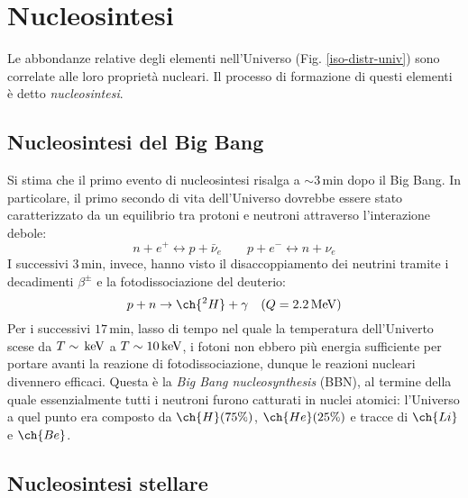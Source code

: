 
\section{Nucleosintesi}

Le abbondanze relative degli elementi nell'Universo (Fig. \ref{iso-distr-univ}) sono correlate alle loro proprietà nucleari. Il processo di formazione di questi elementi è detto \textit{nucleosintesi}.

\subsection{Nucleosintesi del Big Bang}

Si stima che il primo evento di nucleosintesi risalga a $ \sim 3\,\text{min} $ dopo il Big Bang. In particolare, il primo secondo di vita dell'Universo dovrebbe essere stato caratterizzato da un equilibrio tra protoni e neutroni attraverso l'interazione debole:
\begin{equation*}
	n + e^+ \leftrightarrow p + \bar{\nu}_e
	\qquad
	p + e^- \leftrightarrow n + \nu_e
\end{equation*}
I successivi $ 3\,\text{min} $, invece, hanno visto il disaccoppiamento dei neutrini tramite i decadimenti $ \beta^{\pm} $ e la fotodissociazione del deuterio:
\begin{equation*}
	p + n \rightarrow \ch{^2 H} + \gamma \quad (Q = 2.2 \mev)
\end{equation*}
Per i successivi $ 17\,\text{min} $, lasso di tempo nel quale la temperatura dell'Univerto scese da $ T \sim \,\mathrm{keV} $ a $ T \sim 10\,\mathrm{keV} $, i fotoni non ebbero più energia sufficiente per portare avanti la reazione di fotodissociazione, dunque le reazioni nucleari divennero efficaci. Questa è la \textit{Big Bang nucleosynthesis} (BBN), al termine della quale essenzialmente tutti i neutroni furono catturati in nuclei atomici: l'Universo a quel punto era composto da $ \ch{H} (75\%) $, $ \ch{He} (25\%) $ e tracce di $ \ch{Li} $ e $ \ch{Be} $.

\subsection{Nucleosintesi stellare}

